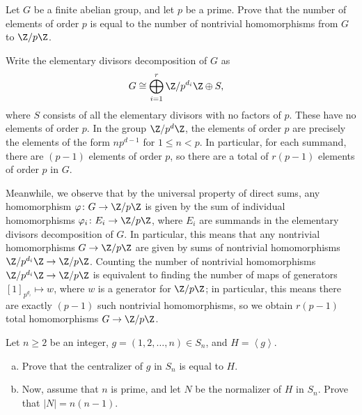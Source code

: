 \documentclass[10pt]{mypackage}
\begin{document}
\begin{problem}[Problem 4]
  Let $G$ be a finite abelian group, and let $p$ be a prime. Prove that the number of elements of order $p$ is equal to the number of nontrivial homomorphisms from $G$ to $\Z/p\Z$.
\end{problem}
\begin{solution}
  Write the elementary divisors decomposition of $G$ as
  \begin{align*}
    G &\cong \bigoplus_{i=1}^{r} \Z/p^{d_i}\Z\oplus S,
  \end{align*}
  where $S$ consists of all the elementary divisors with no factors of $p$. These have no elements of order $p$. In the group $\Z/p^d\Z$, the elements of order $p$ are precisely the elements of the form $np^{d-1}$ for $1\leq n < p$. In particular, for each summand, there are $\left( p-1 \right)$ elements of order $p$, so there are a total of $r\left( p-1 \right)$ elements of order $p$ in $G$.

  Meanwhile, we observe that by the universal property of direct sums, any homomorphism $\varphi\colon G\rightarrow \Z/p\Z$ is given by the sum of individual homomorphisms $\varphi_i\colon E_i\rightarrow \Z/p\Z$, where $E_i$ are summands in the elementary divisors decomposition of $G$. In particular, this means that any nontrivial homomorphisms $G\rightarrow \Z/p\Z$ are given by sums of nontrivial homomorphisms $\Z/p^{d_i}\Z\rightarrow \Z/p\Z$. Counting the number of nontrivial homomorphisms $\Z/p^{d_i}\Z\rightarrow \Z/p\Z$ is equivalent to finding the number of maps of generators $\left[ 1 \right]_{p^{d_i}}\mapsto w$, where $w$ is a generator for $\Z/p\Z$; in particular, this means there are exactly $\left( p-1 \right)$ such nontrivial homomorphisms, so we obtain $r\left( p-1 \right)$ total homomorphisms $G\rightarrow \Z/p\Z$.
\end{solution}
\begin{problem}[Problem 5]
  Let $n\geq 2$ be an integer, $g = \left( 1,2,\dots,n \right)\in S_n$, and $H = \left\langle g \right\rangle$.
  \begin{enumerate}[(a)]
    \item Prove that the centralizer of $g$ in $S_n$ is equal to $H$.
    \item Now, assume that $n$ is prime, and let $N$ be the normalizer of $H$ in $S_n$. Prove that $\left\vert N \right\vert = n\left( n-1 \right)$.
  \end{enumerate}
\end{problem}
\end{document}

